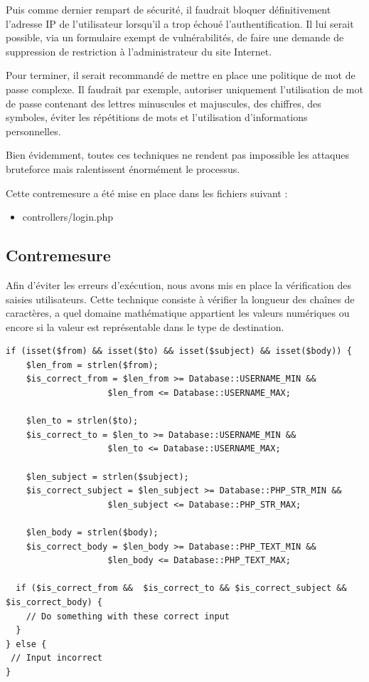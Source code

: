 \documentclass[12pt]{article}
\begin{document}
Puis comme dernier rempart de sécurité, il faudrait bloquer définitivement l'adresse IP de l'utilisateur lorsqu'il a trop échoué l'authentification. Il lui serait possible, via un formulaire exempt de vulnérabilités, de faire une demande de suppression de restriction à l'administrateur du site Internet.

Pour terminer, il serait recommandé de mettre en place une politique de mot de passe complexe. Il faudrait par exemple,  autoriser uniquement l'utilisation de mot de passe contenant des lettres minuscules et majuscules, des chiffres, des symboles, éviter les répétitions de mots et l'utilisation d'informations personnelles. 

Bien évidemment, toutes ces techniques ne rendent pas impossible les attaques bruteforce mais ralentissent énormément le processus.

Cette contremesure a été mise en place dans les fichiers suivant :

\begin{itemize}
\item controllers/login.php
\end{itemize}

\newpage
\subsection{Contremesure}\label{c7}

Afin d'éviter les erreurs d'exécution, nous avons mis en place la vérification des saisies utilisateurs. Cette technique consiste à vérifier la longueur des chaînes de caractères, a quel domaine mathématique appartient les valeurs numériques ou encore si la valeur est représentable dans le type de destination.

\begin{lstlisting}[style=JAVA]
if (isset($from) && isset($to) && isset($subject) && isset($body)) {
    $len_from = strlen($from);
    $is_correct_from = $len_from >= Database::USERNAME_MIN && 
                    $len_from <= Database::USERNAME_MAX;
                            
    $len_to = strlen($to);
    $is_correct_to = $len_to >= Database::USERNAME_MIN && 
                    $len_to <= Database::USERNAME_MAX;

    $len_subject = strlen($subject);
    $is_correct_subject = $len_subject >= Database::PHP_STR_MIN && 
                    $len_subject <= Database::PHP_STR_MAX;
                            
    $len_body = strlen($body);
    $is_correct_body = $len_body >= Database::PHP_TEXT_MIN && 
                    $len_body <= Database::PHP_TEXT_MAX;

  if ($is_correct_from &&  $is_correct_to && $is_correct_subject && $is_correct_body) {
    // Do something with these correct input
  }
} else {
 // Input incorrect
}
\end{lstlisting}
\end{document}
